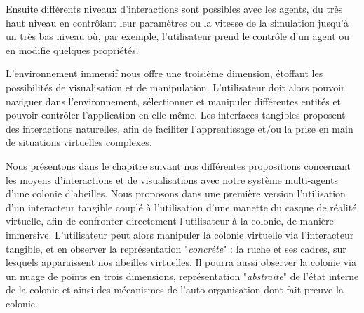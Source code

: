 		Ensuite différents niveaux d'interactions sont possibles avec les agents, du très haut niveau en contrôlant leur paramètres ou la vitesse de la simulation jusqu'à un très bas niveau où, par exemple, l'utilisateur prend le contrôle d'un agent ou en modifie quelques propriétés.
		
		L'environnement immersif nous offre une troisième dimension, étoffant les possibilités de visualisation et de manipulation. L'utilisateur doit alors pouvoir naviguer dans l'environnement, sélectionner et manipuler différentes entités et pouvoir contrôler l'application en elle-même. Les interfaces tangibles proposent des interactions naturelles, afin de faciliter l'apprentissage et/ou la prise en main de situations virtuelles complexes.
		
		Nous présentons dans le chapitre suivant nos différentes propositions concernant les moyens d'interactions et de visualisations avec notre système multi-agents d'une colonie d'abeilles. Nous proposons dans une première version l'utilisation d'un interacteur tangible couplé à l'utilisation d'une manette du casque de réalité virtuelle, afin de confronter directement l'utilisateur à la colonie, de manière immersive.	
		L'utilisateur peut alors manipuler la colonie virtuelle via l'interacteur tangible, et en observer la représentation "\textit{concrète}" : la ruche et ses cadres, sur lesquels apparaissent nos abeilles virtuelles.
		Il pourra aussi observer la colonie via un nuage de points en trois dimensions, représentation "\textit{abstraite}" de l'état interne de la colonie et ainsi des mécanismes de l'auto-organisation dont fait preuve la colonie.